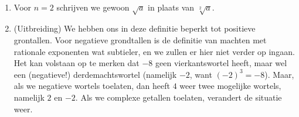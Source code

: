 \documentclass{ximera}
\begin{document}
\begin{remark} \ 
\begin{enumerate}
	\item Voor $n=2$ schrijven we gewoon $\sqrt{a}$ in plaats van $\sqrt[2]{a}$.
	\item (Uitbreiding) We hebben ons in deze definitie beperkt tot positieve grontallen. Voor negatieve grondtallen is de definitie van machten met rationale exponenten wat subtieler, en we zullen er hier niet verder op ingaan. Het kan volstaan op te merken dat $-8$ geen vierkantswortel heeft, maar wel een (negatieve!) derdemachtswortel (namelijk $-2$, want $(-2)^3 = -8$). Maar, als we negatieve wortels toelaten, dan heeft $4$ weer twee mogelijke wortels, namelijk $2$ en $-2$. Als we complexe getallen toelaten, verandert de situatie weer.
\end{enumerate}
\end{remark}
\end{document}
